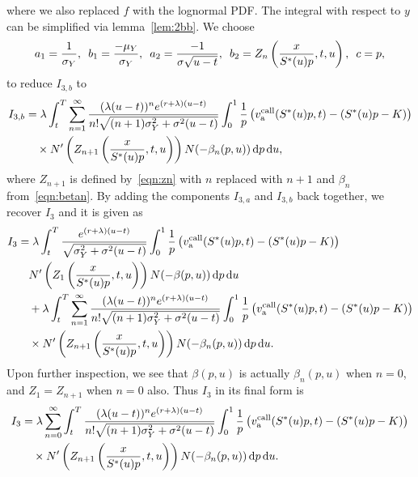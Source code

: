 		where we also replaced $f$ with the lognormal PDF. The integral with respect to $y$ can be simplified via lemma~\ref{lem:2bb}. We choose
		$$
			a_1 = \frac{1}{\sigma_Y}, \enskip b_1 = \frac{-\mu_Y}{\sigma_Y}, \enskip a_2 = \frac{-1}{\sigma\sqrt{u-t}}, \enskip
			b_2 = Z_n\left( \frac{x}{S^*(u)p}, t, u \right), \enskip c = p,
		$$
		to reduce $I_{3,b}$ to
		\begin{align*}
			I_{3,b} &= \lambda \int_t^T \displaystyle\sum\limits_{n=1}^{\infty} \frac{(\lambda(u-t))^ne^{(r+\lambda)(u-t)}}{n!\sqrt{(n+1)\sigma_Y^2 + \sigma^2(u-t)}}\int_0^1 \frac{1}{p}\left( v_{\text{a}}^{\text{call}}(S^*(u)p,t) - (S^*(u)p - K) \right) \\
			&\quad {} \times N'\left( Z_{n+1}\left( \frac{x}{S^*(u)p}, t, u \right)\right)N(-\beta_n(p,u))  \, \mathrm d p \, \mathrm d u,
		\end{align*}
		where $Z_{n+1}$ is defined by~\eqref{eqn:zn} with $n$ replaced with $n+1$ and $\beta_n$ from~\eqref{eqn:betan}. By adding the components $I_{3,a}$ and $I_{3,b}$ back together, we recover $I_3$ and it is given as
		\begin{align*}
			I_3 &=   \lambda  \int_t^T \frac{e^{(r+\lambda)(u-t)}}{\sqrt{\sigma_Y^2 + \sigma^2(u-t)}} \int_0^1 \frac{1}{p} \left( v_{\text{a}}^{\text{call}}(S^*(u)p,t) - (S^*(u)p - K) \right)  \\
			&\quad {} N'\left( Z_1 \left( \frac{x}{S^*(u)p}, t, u \right)\right)N(-\beta(p,u)) \, \mathrm d p \, \mathrm d u \\
			& \quad{} + \lambda \int_t^T \displaystyle\sum\limits_{n=1}^{\infty} \frac{(\lambda(u-t))^ne^{(r+\lambda)(u-t)}}{n!\sqrt{(n+1)\sigma_Y^2 + \sigma^2(u-t)}}\int_0^1 \frac{1}{p}\left( v_{\text{a}}^{\text{call}}(S^*(u)p,t) - (S^*(u)p - K) \right) \\
			&\quad {} \times N'\left( Z_{n+1}\left( \frac{x}{S^*(u)p}, t, u \right)\right)N(-\beta_n(p,u))  \, \mathrm d p \, \mathrm d u.
		\end{align*}
		Upon further inspection, we see that $\beta(p,u)$ is actually $\beta_n(p,u)$ when $n=0$, and $Z_1 = Z_{n+1}$ when $n=0$ also. Thus $I_3$ in its final form is
		\begin{equation}
			\label{eqn:I3put}
			\begin{split}
			I_3 &= \lambda \displaystyle\sum\limits_{n=0}^{\infty} \int_t^T  \frac{(\lambda(u-t))^ne^{(r+\lambda)(u-t)}}{n!\sqrt{(n+1)\sigma_Y^2 + \sigma^2(u-t)}}\int_0^1 \frac{1}{p}\left( v_{\text{a}}^{\text{call}}(S^*(u)p,t) - (S^*(u)p - K) \right) \\
			&\quad {} \times N'\left( Z_{n+1}\left( \frac{x}{S^*(u)p}, t, u \right)\right)N(-\beta_n(p,u))  \, \mathrm d p \, \mathrm d u.
			\end{split}
		\end{equation}
